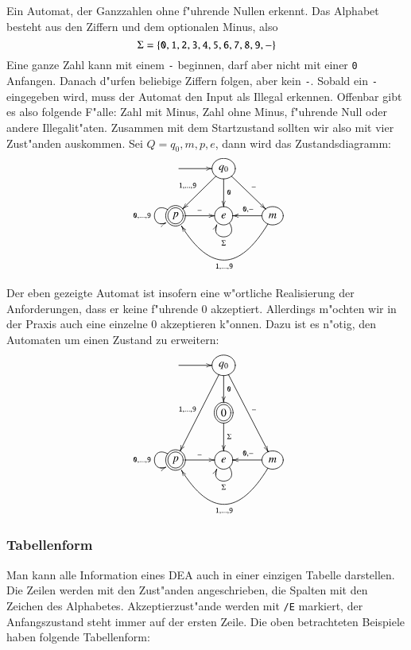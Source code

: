 \begin{beispiel}[\bf Ganzzahlen]
Ein Automat, der Ganzzahlen ohne f"uhrende Nullen erkennt.
Das Alphabet besteht aus den Ziffern und dem optionalen Minus, also
\[
\Sigma=\{
{\tt 0},
{\tt 1},
{\tt 2},
{\tt 3},
{\tt 4},
{\tt 5},
{\tt 6},
{\tt 7},
{\tt 8},
{\tt 9},
{\tt -}
\}
\]
Eine ganze Zahl kann mit einem {\tt -} beginnen, darf
aber nicht mit einer {\tt 0} Anfangen. Danach d"urfen beliebige
Ziffern folgen, aber kein {\tt -}. Sobald ein {\tt -} eingegeben
wird, muss der Automat den Input als Illegal erkennen. Offenbar
gibt es also folgende F"alle: Zahl mit Minus, Zahl ohne Minus,
f"uhrende Null oder andere Illegalit"aten. Zusammen mit dem
Startzustand sollten wir also mit vier Zust"anden auskommen.
Sei $Q={q_0, m,p,e}$, dann wird das Zustandsdiagramm:
\[
\entrymodifiers={++[o][F]}
\xymatrix{
*+\txt{}\ar[r]
	&{q_0}  \ar[dl]_{{\tt 1},\dots,{\tt 9}} \ar[d]^{\tt 0} \ar[dr]^{\tt -}
\\
*++[o][F=]{p}\ar[r]^{\tt -} \ar@(ul,dl)_{{\tt 0},\dots,{\tt 9}}
	&{e} \ar@(dr,dl)^{\Sigma}
		&{m}\ar[l]_{{\tt 0},{\tt -}} \ar@/^40pt/[ll]^{{\tt 1},\dots,{\tt 9}}
}
\]
\end{beispiel}
\begin{beispiel}
Der eben gezeigte Automat ist insofern eine w"ortliche Realisierung
der Anforderungen, dass er keine f"uhrende $0$ akzeptiert. Allerdings
m"ochten wir in der Praxis auch eine einzelne $0$ akzeptieren k"onnen.
Dazu ist es n"otig, den Automaten um einen Zustand zu erweitern:
\[
\entrymodifiers={++[o][F]}
\xymatrix{
*+\txt{}\ar[r]
	&{q_0}  \ar[ddl]_{{\tt 1},\dots,{\tt 9}} \ar[d]^{\tt 0} \ar[ddr]^{\tt -}
\\
*+\txt{}
	&*++[o][F=]{0}\ar[d]^{\Sigma}
\\
*++[o][F=]{p}\ar[r]^{\tt -} \ar@(ul,dl)_{{\tt 0},\dots,{\tt 9}}
	&{e} \ar@(dr,dl)^{\Sigma}
		&{m}\ar[l]_{{\tt 0},{\tt -}} \ar@/^40pt/[ll]^{{\tt 1},\dots,{\tt 9}}
}
\]
\end{beispiel}

\subsubsection{Tabellenform}
Man kann alle Information eines DEA auch in einer einzigen Tabelle 
darstellen. Die Zeilen werden mit den Zust"anden angeschrieben,
die Spalten mit den Zeichen des Alphabetes. Akzeptierzust"ande werden
mit {\tt /E} markiert, der Anfangszustand steht immer auf der ersten
Zeile. Die oben betrachteten Beispiele haben folgende Tabellenform:

